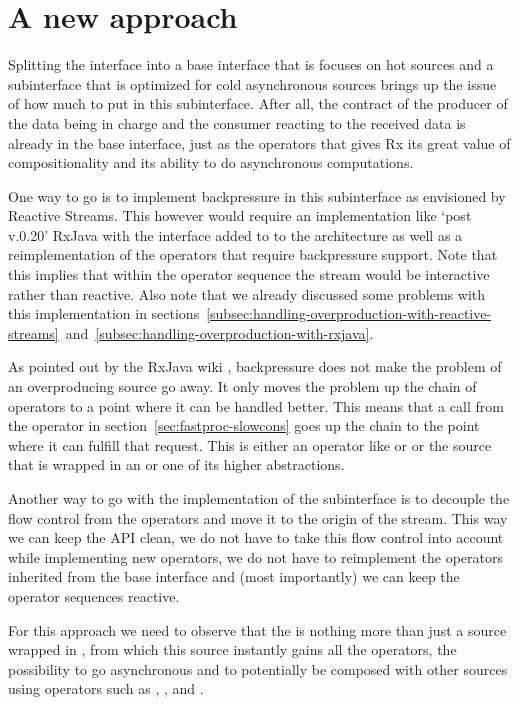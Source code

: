\section{A new approach}
Splitting the \obs interface into a base interface that is focuses on hot sources and a subinterface that is optimized for cold asynchronous sources brings up the issue of how much to put in this subinterface. After all, the contract of the producer of the data being in charge and the consumer reacting to the received data is already in the base interface, just as the operators that gives Rx its great value of compositionality and its ability to do asynchronous computations.

One way to go is to implement backpressure in this subinterface as envisioned by Reactive Streams. This however would require an implementation like `post v.0.20' RxJava with the  interface added to to the architecture as well as a reimplementation of the operators that require backpressure support. Note that this implies that within the operator sequence the stream would be interactive rather than reactive. Also note that we already discussed some problems with this implementation in sections~\ref{subsec:handling-overproduction-with-reactive-streams}~and~\ref{subsec:handling-overproduction-with-rxjava}.

As pointed out by the RxJava wiki \cite{RxJava-Wiki-Backpressure}, backpressure does not make the problem of an overproducing source go away. It only moves the problem up the chain of operators to a point where it can be handled better. This means that a  call from the  operator in section~\ref{sec:fastproc-slowcons} goes up the chain to the point where it can fulfill that request. This is either an operator like  or  or the source that is wrapped in an  or one of its higher abstractions.

Another way to go with the implementation of the subinterface is to decouple the flow control from the operators and move it to the origin of the stream. This way we can keep the API clean, we do not have to take this flow control into account while implementing new operators, we do not have to reimplement the operators inherited from the base interface and (most importantly) we can keep the operator sequences reactive.

For this approach we need to observe that the \obs is nothing more than just a source wrapped in , from which this source instantly gains all the operators, the possibility to go asynchronous and to potentially be composed with other sources using operators such as , ,  and .

